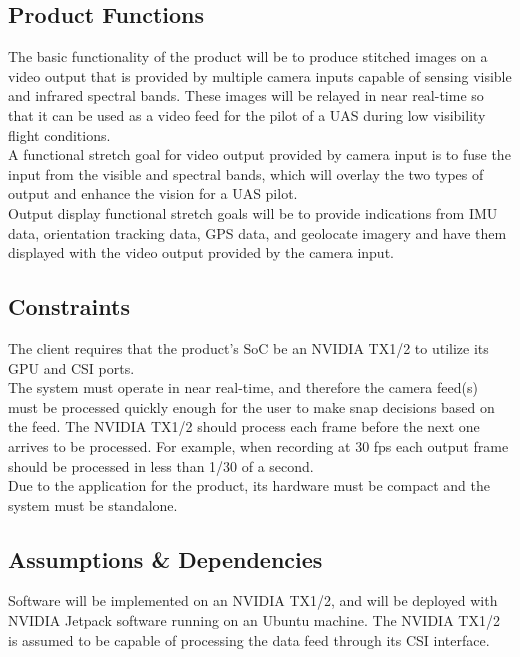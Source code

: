 \documentclass[letterpaper,10pt,serif,draftclsnofoot,onecolumn,compsoc,titlepage]{IEEEtran}
\begin{document}
\subsection{Product Functions}

The basic functionality of the product will be to produce stitched images on a video 
output that is provided by multiple camera inputs capable of sensing visible and 
infrared spectral bands. These images will be relayed in near real-time so that it 
can be used as a video feed for the pilot of a UAS during low visibility flight 
conditions. \\

A functional stretch goal for video output provided by camera input is to fuse the 
input from the visible and spectral bands, which will overlay the two types of output 
and enhance the vision for a UAS pilot. \\

Output display functional stretch goals will be to provide indications from IMU data, 
orientation tracking data, GPS data, and geolocate imagery and have them displayed 
with the video output provided by the camera input. \\

\subsection{Constraints}

The client requires that the product's SoC be an NVIDIA TX1/2 to utilize its GPU 
and CSI ports. \\

The system must operate in near real-time, and therefore the camera feed(s) must be 
processed quickly enough for the user to make snap decisions based on the feed. The 
NVIDIA TX1/2 should process each frame before the next one arrives to be processed. 
For example, when recording at 30 fps each output frame should be processed in 
less than 1/30 of a second.\\

Due to the application for the product, its hardware must be compact and the system 
must be standalone. \\

\subsection{Assumptions \& Dependencies}

Software will be implemented on an NVIDIA TX1/2, and will be deployed with NVIDIA 
Jetpack software running on an Ubuntu machine. The NVIDIA TX1/2 is assumed to be 
capable of processing the data feed through its CSI interface. 
\end{document}

